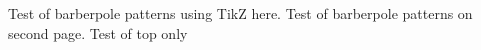 \documentclass{article}
\begin{document}
Test of barberpole patterns using TikZ here. 
\clearpage
Test of barberpole patterns on second page. 
\clearpage
Test of top only
\end{document}
